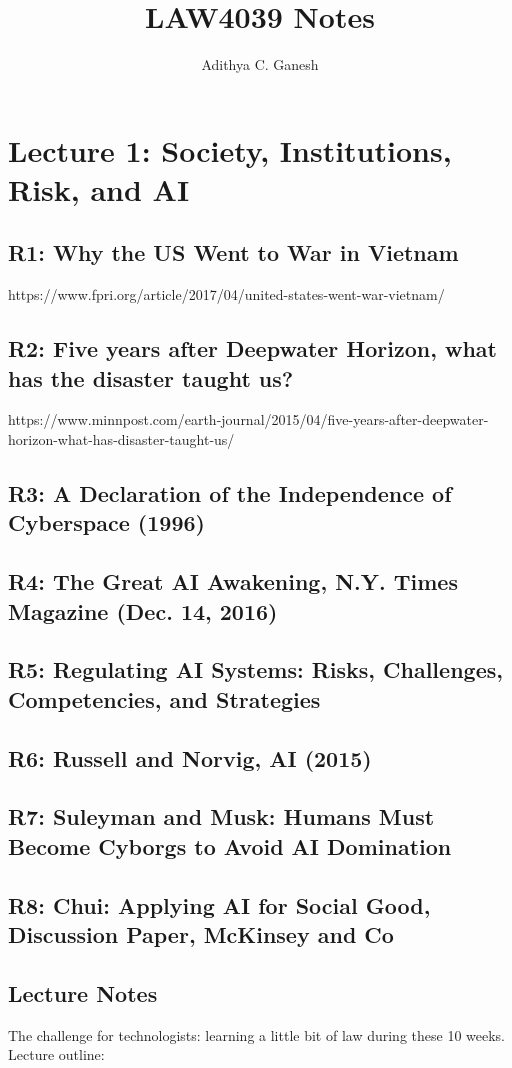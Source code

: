 \documentclass{article}
\title{LAW4039 Notes}
\author{Adithya C. Ganesh}
\begin{document}
\maketitle

\tableofcontents

\section{Lecture 1: Society, Institutions, Risk, and AI}

\subsection{R1: Why the US Went to War in Vietnam}

https://www.fpri.org/article/2017/04/united-states-went-war-vietnam/

\subsection{R2: Five years after Deepwater Horizon, what has the disaster taught us?}

https://www.minnpost.com/earth-journal/2015/04/five-years-after-deepwater-horizon-what-has-disaster-taught-us/

\subsection{R3: A Declaration of the Independence of Cyberspace (1996)}

\subsection{R4: The Great AI Awakening, N.Y. Times Magazine (Dec. 14, 2016)}

\subsection{R5: Regulating AI Systems: Risks, Challenges, Competencies, and Strategies}

\subsection{R6: Russell and Norvig, AI (2015)}

\subsection{R7: Suleyman and Musk: Humans Must Become Cyborgs to Avoid AI Domination}

\subsection{R8: Chui: Applying AI for Social Good, Discussion Paper, McKinsey and Co}

\subsection{Lecture Notes}

The challenge for technologists: learning a little bit of law during these 10 weeks.  Lecture outline:
\end{document}
